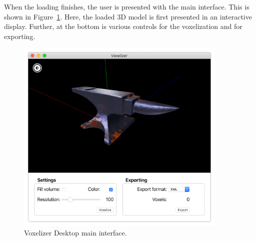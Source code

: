 When the loading finishes, the user is presented with the main interface. This is shown in Figure~\ref{fig:voxelizer-desktop-gui-main-light}. Here, the loaded 3D model is first presented in an interactive display. Further, at the bottom is various controls for the voxelization and for exporting.
\begin{figure}[htp]
    \centering
    \includegraphics[width=0.9\textwidth]{sections/result/figures/voxelizer-desktop-gui-main-light.png}
    \caption{Voxelizer Desktop main interface.}
    \label{fig:voxelizer-desktop-gui-main-light}
\end{figure}
\clearpage

